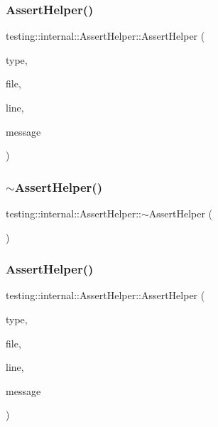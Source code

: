 \subsubsection{\texorpdfstring{AssertHelper()}{AssertHelper()}\hspace{0.1cm}{\footnotesize\ttfamily [1/3]}}
{\footnotesize\ttfamily testing\+::internal\+::\+Assert\+Helper\+::\+Assert\+Helper (\begin{DoxyParamCaption}\item[{Test\+Part\+Result\+::\+Type}]{type,  }\item[{const char $\ast$}]{file,  }\item[{int}]{line,  }\item[{const char $\ast$}]{message }\end{DoxyParamCaption})}

\mbox{\label{classtesting_1_1internal_1_1_assert_helper_a51c640785d4ed4a0155cc9aa857d8931}} 
\subsubsection{\texorpdfstring{$\sim$AssertHelper()}{~AssertHelper()}\hspace{0.1cm}{\footnotesize\ttfamily [1/3]}}
{\footnotesize\ttfamily testing\+::internal\+::\+Assert\+Helper\+::$\sim$\+Assert\+Helper (\begin{DoxyParamCaption}{ }\end{DoxyParamCaption})}

\mbox{\label{classtesting_1_1internal_1_1_assert_helper_ac2c9334518fd4087189b4505567a3c90}} 
\subsubsection{\texorpdfstring{AssertHelper()}{AssertHelper()}\hspace{0.1cm}{\footnotesize\ttfamily [2/3]}}
{\footnotesize\ttfamily testing\+::internal\+::\+Assert\+Helper\+::\+Assert\+Helper (\begin{DoxyParamCaption}\item[{Test\+Part\+Result\+::\+Type}]{type,  }\item[{const char $\ast$}]{file,  }\item[{int}]{line,  }\item[{const char $\ast$}]{message }\end{DoxyParamCaption})}

